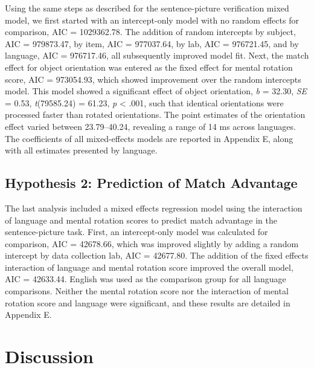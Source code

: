 \documentclass[
  man,floatsintext]{apa7}
\begin{document}
Using the same steps as described for the sentence-picture verification
mixed model, we first started with an intercept-only model with no
random effects for comparison, AIC =
1029362.78. The
addition of random intercepts by subject, AIC =
979873.47, by item,
AIC = 977037.64, by
lab, AIC = 976721.45,
and by language, AIC =
976717.46, all
subsequently improved model fit. Next, the match effect for object
orientation was entered as the fixed effect for mental rotation score,
AIC = 973054.93,
which showed improvement over the random intercepts model. This model
showed a significant effect of object orientation, \emph{b} =
32.30, \emph{SE} =
0.53,
\emph{t}(79585.24) =
61.23, \emph{p}
\textless{} .001, such that identical orientations were
processed faster than rotated orientations. The point estimates of the
orientation effect varied between 23.79--40.24, revealing a range of 14
ms across languages. The coefficients of all mixed-effects models are
reported in Appendix E, along with all estimates presented by language.

\hypertarget{hypothesis-2-prediction-of-match-advantage}{%
\subsection{Hypothesis 2: Prediction of Match Advantage}\label{hypothesis-2-prediction-of-match-advantage}}

The last analysis included a mixed effects regression model using the
interaction of language and mental rotation scores to predict match
advantage in the sentence-picture task. First, an intercept-only model
was calculated for comparison, AIC =
42678.66, which
was improved slightly by adding a random intercept by data collection
lab, AIC = 42677.80. The
addition of the fixed effects interaction of language and mental
rotation score improved the overall model, AIC =
42633.44. English
was used as the comparison group for all language comparisons. Neither
the mental rotation score nor the interaction of mental rotation score
and language were significant, and these results are detailed in
Appendix E.

\hypertarget{discussion}{%
\section{Discussion}\label{discussion}}
\end{document}
